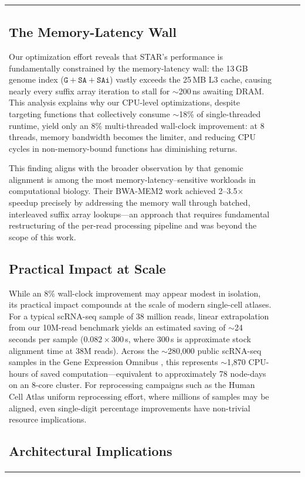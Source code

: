 \documentclass[11pt,twocolumn]{article}
\begin{document}
\begin{table}[t]
\begin{tabular}{@{}lrrr@{}}
\subsection{The Memory-Latency Wall}

Our optimization effort reveals that STAR's performance is fundamentally constrained by the memory-latency wall: the 13\,GB genome index ($\texttt{G} + \texttt{SA} + \texttt{SAi}$) vastly exceeds the 25\,MB L3 cache, causing nearly every suffix array iteration to stall for $\sim$200\,ns awaiting DRAM. This analysis explains why our CPU-level optimizations, despite targeting functions that collectively consume $\sim$18\% of single-threaded runtime, yield only an 8\% multi-threaded wall-clock improvement: at 8 threads, memory bandwidth becomes the limiter, and reducing CPU cycles in non-memory-bound functions has diminishing returns.

This finding aligns with the broader observation by \citet{vasimuddin2019efficient} that genomic alignment is among the most memory-latency--sensitive workloads in computational biology. Their BWA-MEM2 work achieved 2--3.5$\times$ speedup precisely by addressing the memory wall through batched, interleaved suffix array lookups---an approach that requires fundamental restructuring of the per-read processing pipeline and was beyond the scope of this work.

\subsection{Practical Impact at Scale}

While an 8\% wall-clock improvement may appear modest in isolation, its practical impact compounds at the scale of modern single-cell atlases. For a typical scRNA-seq sample of 38 million reads, linear extrapolation from our 10M-read benchmark yields an estimated saving of $\sim$24 seconds per sample ($0.082 \times 300$\,s, where 300\,s is approximate stock alignment time at 38M reads). Across the $\sim$280{,}000 public scRNA-seq samples in the Gene Expression Omnibus \citep{edgar2002gene}, this represents $\sim$1{,}870 CPU-hours of saved computation---equivalent to approximately 78 node-days on an 8-core cluster. For reprocessing campaigns such as the Human Cell Atlas uniform reprocessing effort, where millions of samples may be aligned, even single-digit percentage improvements have non-trivial resource implications.

\subsection{Architectural Implications}


\end{tabular}
\end{table}
\end{document}
